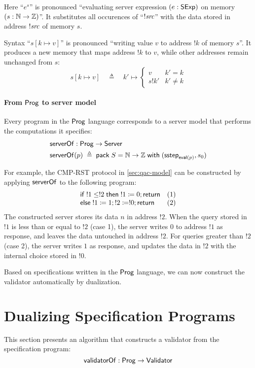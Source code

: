 Here ``$e^s$'' is pronounced ``evaluating server expression $(e:\mathsf{SExp})$ on
memory $(s:\mathbb N\to\mathbb Z)$''.  It substitutes all occurences of ``$!\mathit{src}$'' with
the data stored in address $!\mathit{src}$ of memory $s$.

Syntax ``$s[k\mapsto v]$'' is pronounced ``writing value $v$ to address $!k$ of
memory $s$''.  It produces a new memory that maps address $!k$ to $v$, while
other addresses remain unchanged from $s$:
\[s[k\mapsto v]\quad\triangleq\quad k'\mapsto\begin{cases}v&k'=k\\
s!k'&k'\neq k\end{cases}\]

\paragraph{From $\mathsf{Prog}$ to server model}
Every program in the $\mathsf{Prog}$ language corresponds to a server model that
performs the computations it specifies:
\begin{align*}
  &\mathsf{serverOf}:\mathsf{Prog}\to\mathsf{Server}\\
  &\mathsf{serverOf}(p)\;\triangleq\;\mathsf{pack}\;S=\mathbb N\to\mathbb Z\;\mathsf{with}\;(\mathsf{sstep}_{\mathsf{eval}(p)},s_0)
\end{align*}

For example, the CMP-RST protocol in \autoref{sec:qac-model} can be constructed
by applying $\mathsf{serverOf}$ to the following program:
\[\begin{array}{ll}
\mathsf{if}\; !1\le!2\;\mathsf{then}\; !1\coloneqq0;\mathsf{return}&(1)\\
\mathsf{else}\;!1\coloneqq1;!2\coloneqq!0;\mathsf{return}&(2)
\end{array}\]
The constructed server stores its data $n$ in address $!2$.  When the query
stored in $!1$ is less than or equal to $!2$ (case 1), the server writes $0$ to
address $!1$ as response, and leaves the data untouched in address $!2$.  For
queries greater than $!2$ (case 2), the server writes $1$ as response, and
updates the data in $!2$ with the internal choice stored in $!0$.

Based on specifications written in the $\mathsf{Prog}$ language, we can now construct
the validator automatically by dualization.

\section{Dualizing Specification Programs}
\label{sec:dualize-prog}
This section presents an algorithm that constructs a validator from the
specification program:
\[\mathsf{validatorOf}:\mathsf{Prog}\to\mathsf{Validator}\]

